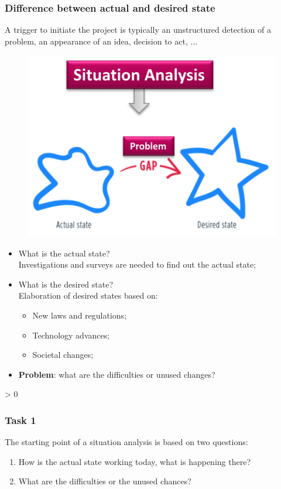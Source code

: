 \documentclass{article}
\makeatletter
\newcommand{\wrapfill}{
    \par
    \ifnum \value{WF@wrappedlines} > 0
        \addtocounter{WF@wrappedlines}{-1}%
        \null\vspace{
            \arabic{WF@wrappedlines}
            \baselineskip
        }
        \WFclear
    \fi
    \phantom{}
}
\makeatother
\begin{document}
\subsubsection{Difference between actual and desired state}
A trigger to initiate the project is typically an unstructured detection
of a problem, an appearance of an idea, decision to act, ...

\setlength{\intextsep}{0pt}%
\begin{figure}
    \vspace*{.25cm}
    \includegraphics[width=.45\textwidth]{media/sit-analysis.png}
    \vspace{-2.6cm}
\end{figure}

\phantom{}

\begin{itemize}
    \item What is the actual state?\\
    Investigations and surveys are needed to find out the actual state;
    \item What is the desired state?\\
    Elaboration of desired states based on:
        \begin{itemize}
            \item New laws and regulations;
            \item Technology advances;
            \item Societal changes;
        \end{itemize}
    \item \textbf{Problem}: what are the difficulties or unused changes?
\end{itemize}
\wrapfill

\subsubsection{Task 1}
The starting point of a situation analysis is based on two questions:
\begin{enumerate}
    \item How is the actual state working today, what is happening there?
    \item What are the difficulties or the unused chances?
\end{enumerate}
\end{document}
